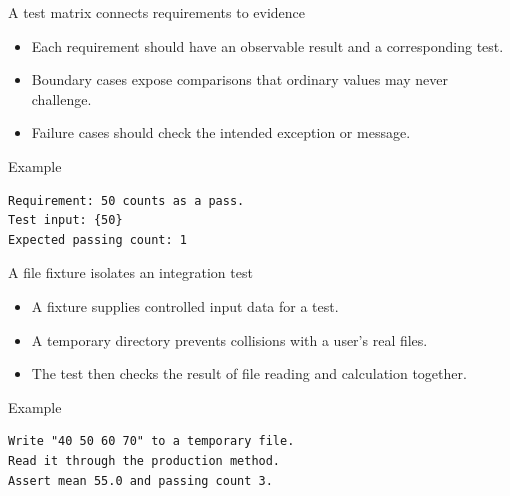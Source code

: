 \documentclass[10pt,aspectratio=169]{beamer}
\begin{document}
\begin{frame}[fragile,t]{A test matrix connects requirements to evidence}
\begin{itemize}
\item Each requirement should have an observable result and a corresponding test.
\item Boundary cases expose comparisons that ordinary values may never challenge.
\item Failure cases should check the intended exception or message.
\end{itemize}
\vspace{1mm}\begin{block}{Example}
\begin{lstlisting}
Requirement: 50 counts as a pass.
Test input: {50}
Expected passing count: 1
\end{lstlisting}
\end{block}
\end{frame}

\begin{frame}[fragile,t]{A file fixture isolates an integration test}
\begin{itemize}
\item A fixture supplies controlled input data for a test.
\item A temporary directory prevents collisions with a user's real files.
\item The test then checks the result of file reading and calculation together.
\end{itemize}
\vspace{1mm}\begin{block}{Example}
\begin{lstlisting}
Write "40 50 60 70" to a temporary file.
Read it through the production method.
Assert mean 55.0 and passing count 3.
\end{lstlisting}
\end{block}
\end{frame}
\end{document}
